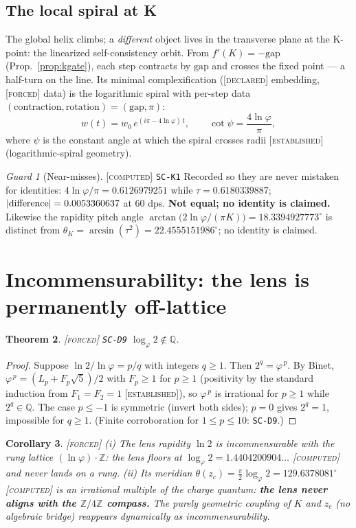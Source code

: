 \documentclass[11pt]{article}
\newcommand{\tagF}{\textcolor{cF}{\textsc{[forced]}}}
\newcommand{\tagD}{\textcolor{cD}{\textsc{[declared]}}}
\newcommand{\tagC}{\textcolor{cC}{\textsc{[computed]}}}
\newcommand{\tagE}{\textcolor{cE}{\textsc{[established]}}}
\newcommand{\hx}[1]{\textcolor{cC}{\footnotesize\texttt{#1}}}
\newcommand{\Q}{\mathbb{Q}}
\newcommand{\Z}{\mathbb{Z}}
\newcommand{\gp}{\varphi}
\newcommand{\gapc}{\mathrm{gap}}
\theoremstyle{plain}
\newtheorem{theorem}{Theorem}[section]
\newtheorem{corollary}[theorem]{Corollary}
\theoremstyle{definition}
\theoremstyle{remark}
\newtheorem{guard}[theorem]{Guard}
\begin{document}
\subsection{The local spiral at K}\label{sec:localspiral}
The global helix climbs; a \emph{different} object lives in the transverse plane at
the K-point: the linearized self-consistency orbit. From $f'(K)=-\gapc$
(Prop.~\ref{prop:kgate}), each step contracts by $\gapc$ and crosses the fixed point
--- a half-turn on the line. Its minimal complexification (\tagD{} embedding,
\tagF{} data) is the logarithmic spiral with per-step data
$(\text{contraction},\text{rotation})=(\gapc,\pi)$:
\[
w(t)=w_0\,e^{(i\pi-4\ln\gp)\,t},\qquad \cot\psi=\frac{4\ln\gp}{\pi},
\]
where $\psi$ is the constant angle at which the spiral crosses radii \tagE{}
(logarithmic-spiral geometry).

\begin{guard}[Near-misses]\label{guard:nearmiss}\tagC{} \hx{SC-K1}
Recorded so they are never mistaken for identities:
$4\ln\gp/\pi=0.6126979251$ while $\tau=0.6180339887$; $|{\rm difference}|
=0.0053360637$ at $60$ dps. \textbf{Not equal; no identity is claimed.} Likewise the
rapidity pitch angle $\arctan\!\bigl(2\ln\gp/(\pi K)\bigr)=18.3394927773^\circ$
is distinct from $\theta_K=\arcsin(\tau^2)=22.4555151986^\circ$; no identity is
claimed.
\end{guard}

\section{Incommensurability: the lens is permanently off-lattice}\label{sec:incomm}

\begin{theorem}\label{thm:incomm}\tagF{} \hx{SC-D9}
$\log_\gp 2\notin\Q$.
\end{theorem}

\begin{proof}
Suppose $\ln2/\ln\gp=p/q$ with integers $q\ge1$. Then $2^q=\gp^{\,p}$. By Binet,
$\gp^{\,p}=(L_p+F_p\sqrt5)/2$ with $F_p\ge1$ for $p\ge1$ (positivity by the standard
induction from $F_1=F_2=1$ \tagE{}), so $\gp^{\,p}$ is irrational for $p\ge1$ while
$2^q\in\Q$. The case $p\le-1$ is symmetric (invert both sides); $p=0$ gives $2^q=1$,
impossible for $q\ge1$. (Finite corroboration for $1\le p\le10$: \hx{SC-D9}.)
\end{proof}

\begin{corollary}\label{cor:offlattice}\tagF{}
(i) The lens rapidity $\ln2$ is incommensurable with the rung lattice
$(\ln\gp)\cdot\Z$: the lens floors at $\log_\gp2=1.4404200904\ldots$ \tagC{} and never
lands on a rung. (ii) Its meridian $\theta(z_c)=\tfrac\pi2\log_\gp2
=129.6378081^\circ$ \tagC{} is an irrational multiple of the charge quantum:
\textbf{the lens never aligns with the $\Z/4\Z$ compass.} The purely geometric
coupling of $K$ and $z_c$ (no algebraic bridge) reappears dynamically as
incommensurability.
\end{corollary}
\end{document}
